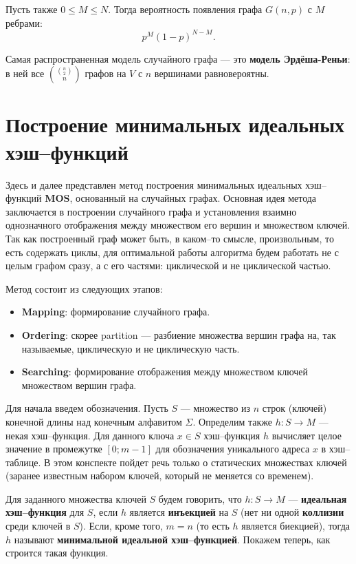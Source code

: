 \documentclass[specialist,
               substylefile = spbu.rtx,
               subf,href,colorlinks=true, 12pt]{disser}
\begin{document}
Пусть также $0 \leq M \leq N$. Тогда вероятность появления графа $G(n,p)$ с $M$ ребрами:
%
\begin{equation}
p^M(1-p)^{N - M}.
\end{equation}
%

Самая распространенная модель случайного графа --- это \textbf{модель Эрдёша-Реньи}: в ней все $\binom{\binom{n}{2}}{n}$ графов на $V$ с $n$ вершинами равновероятны.


\newpage

\section{Построение минимальных идеальных хэш--функций}

Здесь и далее представлен метод построения минимальных идеальных хэш--функций \textbf{MOS}, основанный на случайных графах.
Основная идея метода заключается в построении случайного графа и установления взаимно однозначного отображения между множеством его вершин и множеством ключей. Так как построенный граф может быть, в каком--то смысле, произвольным, то есть содержать циклы, для оптимальной работы алгоритма будем работать не с целым графом сразу, а с его частями: циклической и не циклической частью.

Метод состоит из следующих этапов:

\begin{itemize}
\item \textbf{Mapping}: формирование случайного графа.
\item \textbf{Ordering}: скорее partition --- разбиение множества вершин графа на, так называемые, циклическую и не циклическую часть.
\item \textbf{Searching}: формирование отображения между множеством ключей множеством вершин графа.
\end{itemize}

Для начала введем обозначения. Пусть $S$ --- множество из $n$ строк (ключей) конечной длины над конечным алфавитом $\Sigma$.
Определим также $h: S \longrightarrow M$ ---  некая хэш--функция. Для данного ключа $x \in S$ хэш--функция $h$ вычисляет целое значение в промежутке $[0;m-1]$ для обозначения уникального адреса  $x$ в хэш--таблице. В этом конспекте пойдет речь только о статических множествах ключей (заранее известным набором ключей, который не меняется со временем).

Для заданного множества ключей $S$ будем говорить, что $h: S \longrightarrow M$ --- \textbf{идеальная хэш--функция} для $S$, если $h$ является \textbf{инъекцией} на $S$ (нет ни одной \textbf{коллизии} среди ключей в $S$). Если, кроме того, $m = n$ (то есть $h$ является биекцией), тогда $h$ называют \textbf{минимальной идеальной хэш--функцией}. Покажем теперь, как строится такая функция.
\end{document}
